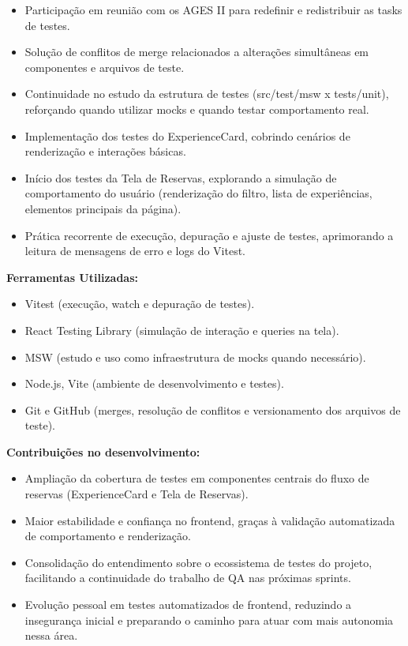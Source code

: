 \begin{itemize}
\item
  Participação em reunião com os AGES II para redefinir e redistribuir
  as tasks de testes.
\item
  Solução de conflitos de merge relacionados a alterações simultâneas em
  componentes e arquivos de teste.
\item
  Continuidade no estudo da estrutura de testes (src/test/msw x
  tests/unit), reforçando quando utilizar mocks e quando testar
  comportamento real.
\item
  Implementação dos testes do ExperienceCard, cobrindo cenários de
  renderização e interações básicas.
\item
  Início dos testes da Tela de Reservas, explorando a simulação de
  comportamento do usuário (renderização do filtro, lista de
  experiências, elementos principais da página).
\item
  Prática recorrente de execução, depuração e ajuste de testes,
  aprimorando a leitura de mensagens de erro e logs do Vitest.
\end{itemize}

\textbf{Ferramentas Utilizadas:}

\begin{itemize}
\item
  Vitest (execução, watch e depuração de testes).
\item
  React Testing Library (simulação de interação e queries na tela).
\item
  MSW (estudo e uso como infraestrutura de mocks quando necessário).
\item
  Node.js, Vite (ambiente de desenvolvimento e testes).
\item
  Git e GitHub (merges, resolução de conflitos e versionamento dos arquivos de
  teste).
\end{itemize}

\textbf{Contribuições no desenvolvimento:}

\begin{itemize}
\item
  Ampliação da cobertura de testes em componentes centrais do fluxo de
  reservas (ExperienceCard e Tela de Reservas).
\item
  Maior estabilidade e confiança no frontend, graças à validação
  automatizada de comportamento e renderização.
\item
  Consolidação do entendimento sobre o ecossistema de testes do projeto,
  facilitando a continuidade do trabalho de QA nas próximas sprints.
\item
  Evolução pessoal em testes automatizados de frontend, reduzindo a
  insegurança inicial e preparando o caminho para atuar com mais
  autonomia nessa área.
\end{itemize}

